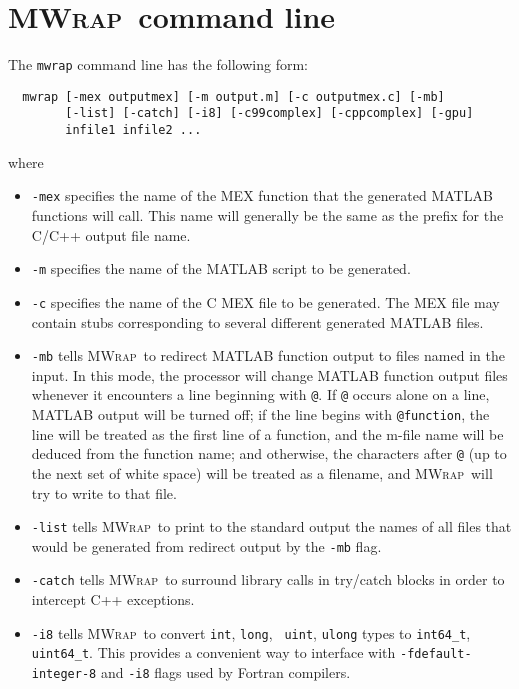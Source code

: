 \documentclass[12pt]{article}
\newcommand{\mwrap}{\textsc{MWrap}}
\begin{document}
\section{\mwrap\ command line}

The {\tt mwrap} command line has the following form:
\begin{verbatim}
  mwrap [-mex outputmex] [-m output.m] [-c outputmex.c] [-mb] 
        [-list] [-catch] [-i8] [-c99complex] [-cppcomplex] [-gpu]
        infile1 infile2 ...
\end{verbatim}
where
\begin{itemize}

\item {\tt -mex} specifies the name of the MEX function that the
  generated MATLAB functions will call.  This name will generally be
  the same as the prefix for the C/C++ output file name.

\item {\tt -m} specifies the name of the MATLAB script to be
  generated.

\item {\tt -c} specifies the name of the C MEX file to be generated.
  The MEX file may contain stubs corresponding to several different
  generated MATLAB files.

\item {\tt -mb} tells \mwrap\ to redirect MATLAB function output to
  files named in the input.  In this mode, the processor will change
  MATLAB function output files whenever it encounters a line
  beginning with \verb|@|.  If \verb|@| occurs alone on a line,
  MATLAB output will be turned off; if the line begins with \verb|@function|,
  the line will be treated as the first line of a function, and the m-file
  name will be deduced from the function name; and otherwise, the characters 
  after \verb|@| (up to the next set of white space) will be treated as a
  filename, and \mwrap\ will try to write to that file.

\item {\tt -list} tells \mwrap\ to print to the standard output the
  names of all files that would be generated from redirect output by
  the {\tt -mb} flag.

\item {\tt -catch} tells \mwrap\ to surround library calls in try/catch
  blocks in order to intercept C++ exceptions.

\item {\tt -i8} tells \mwrap\ to convert {\tt int}, {\tt long}, {\tt
  uint}, {\tt ulong} types to {\tt int64\_t}, {\tt uint64\_t}. This
  provides a convenient way to interface with {\tt -fdefault-integer-8}
  and {\tt -i8} flags used by Fortran compilers.


\end{itemize}
\end{document}
